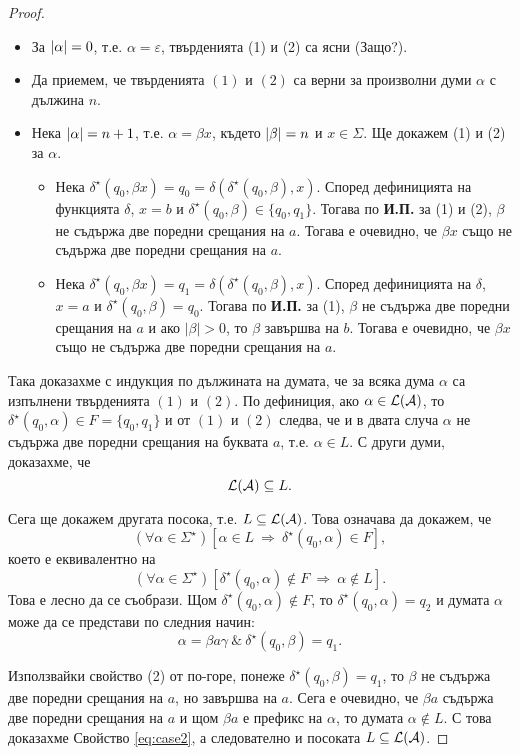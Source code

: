 \begin{proof}
  \begin{itemize}
  \item
    За $\lvert{\alpha}\rvert = 0$, т.е. $\alpha = \varepsilon$, твърденията (1) и (2) са ясни (Защо?).
  \item
    Да приемем, че твърденията $(1)$ и $(2)$ са верни за произволни думи $\alpha$ с дължина $n$.
  \item
    Нека $\lvert{\alpha}\rvert = n+1$, т.е. $\alpha = \beta x$, където $\lvert{\beta}\rvert = n$ и $x \in \Sigma$.
    Ще докажем (1) и (2) за $\alpha$.
    \begin{itemize}[-]
    \item 
      Нека $\delta^\star(q_0,\beta x) = q_0 = \delta(\delta^\star(q_0,\beta),x)$.
      Според дефиницията на функцията $\delta$, $x = b$ и $\delta^\star(q_0,\beta) \in \{q_0,q_1\}$.
      Тогава по {\bf И.П.} за (1) и (2), $\beta$ не съдържа две поредни срещания на $a$.
      Тогава е очевидно, че $\beta x$ също не съдържа две поредни срещания на $a$.
    \item
      Нека $\delta^\star(q_0,\beta x) = q_1 = \delta(\delta^\star(q_0,\beta),x)$.
      Според дефиницията на $\delta$, $x = a$ и $\delta^\star(q_0,\beta) = q_0$.
      Тогава по {\bf И.П.} за (1), $\beta$ не съдържа две поредни срещания на $a$ и ако $|\beta| > 0$, то $\beta$ завършва на $b$.
      Тогава е очевидно, че $\beta x$ също не съдържа две поредни срещания на $a$.
    \end{itemize}
  \end{itemize}
  
 Така доказахме с индукция по дължината на думата, че за всяка дума $\alpha$ са  изпълнени твърденията $(1)$ и $(2)$.
 По дефиниция, ако $\alpha \in \mathcal{L}(\mathcal{A})$, то $\delta^\star(q_0,\alpha) \in F = \{q_0,q_1\}$ и от $(1)$ и $(2)$ следва, че и в двата случа
 $\alpha$ не съдържа две поредни срещания на буквата $a$, т.е. $\alpha \in L$.
 С други думи, доказахме, че 
 \[\mathcal{L}(\mathcal{A}) \subseteq L.\]

 Сега ще докажем другата посока, т.е. $L \subseteq \mathcal{L}(\mathcal{A})$.
 Това означава да докажем, че
 \[(\forall \alpha \in \Sigma^\star)[\alpha \in L\ \Rightarrow\ \delta^\star(q_0,\alpha) \in F],\]
 което е еквивалентно на
 \begin{equation}
   \label{eq:case2}
   (\forall \alpha \in \Sigma^\star)[\delta^\star(q_0,\alpha) \not\in F \ \Rightarrow\ \alpha\not\in L].
 \end{equation}
 Това е лесно да се съобрази.
 Щом $\delta^\star(q_0,\alpha) \not\in F$, то 
 $\delta^\star(q_0,\alpha) = q_2$ и думата $\alpha$ може да се представи по следния начин:
 \[\alpha = \beta a \gamma\ \&\ \delta^\star(q_0,\beta) = q_1.\]
 
 Използвайки свойство (2) от по-горе, понеже $\delta^\star(q_0,\beta) = q_1$, то
 $\beta$ не съдържа две поредни срещания на $a$, но завършва на $a$.
 Сега е очевидно, че $\beta a$ съдържа две поредни срещания на $a$ и 
 щом $\beta a$ е префикс на $\alpha$, то думата $\alpha \not\in L$.
 С това доказахме Свойство \ref{eq:case2}, а следователно и посоката $L\subseteq \mathcal{L}(\mathcal{A})$.
\end{proof}


